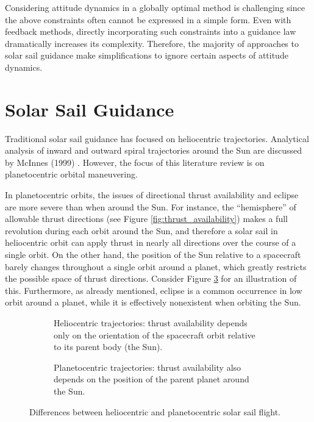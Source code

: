 Considering attitude dynamics in a globally optimal method is challenging since the above constraints often cannot be expressed in a simple form. Even with feedback methods, directly incorporating such constraints into a guidance law dramatically increases its complexity. Therefore, the majority of approaches to solar sail guidance make simplifications to ignore certain aspects of attitude dynamics.


\section{Solar Sail Guidance}
\label{sec:solar_sail_guidance}
Traditional solar sail guidance has focused on heliocentric trajectories. Analytical analysis of inward and outward spiral trajectories around the Sun are discussed by McInnes (1999) \cite{mcinnes}. However, the focus of this literature review is on planetocentric orbital maneuvering.

In planetocentric orbits, the issues of directional thrust availability and eclipse are more severe than when around the Sun. For instance, the ``hemisphere'' of allowable thrust directions (see Figure \ref{fig:thrust_availability}) makes a full revolution during each orbit around the Sun, and therefore a solar sail in heliocentric orbit can apply thrust in nearly all directions over the course of a single orbit. On the other hand, the position of the Sun relative to a spacecraft barely changes throughout a single orbit around a planet, which greatly restricts the possible space of thrust directions. Consider Figure \ref{fig:angle_availability} for an illustration of this. Furthermore, as already mentioned, eclipse is a common occurrence in low orbit around a planet, while it is effectively nonexistent when orbiting the Sun.

\begin{figure}[H]
  \centering
  \begin{subfigure}[t]{0.45\textwidth}
    
    \caption{Heliocentric trajectories: thrust availability depends only on the orientation of the spacecraft orbit relative to its parent body (the Sun).}
    \label{fig:angle_availability_sun}
  \end{subfigure}
  \hfill
  \begin{subfigure}[t]{0.45\textwidth}
    
    \caption{Planetocentric trajectories: thrust availability also depends on the position of the parent planet around the Sun.}
    \label{fig:angle_availability_earth}
  \end{subfigure}
  \caption{Differences between heliocentric and planetocentric solar sail flight.}
  \label{fig:angle_availability}
\end{figure}

